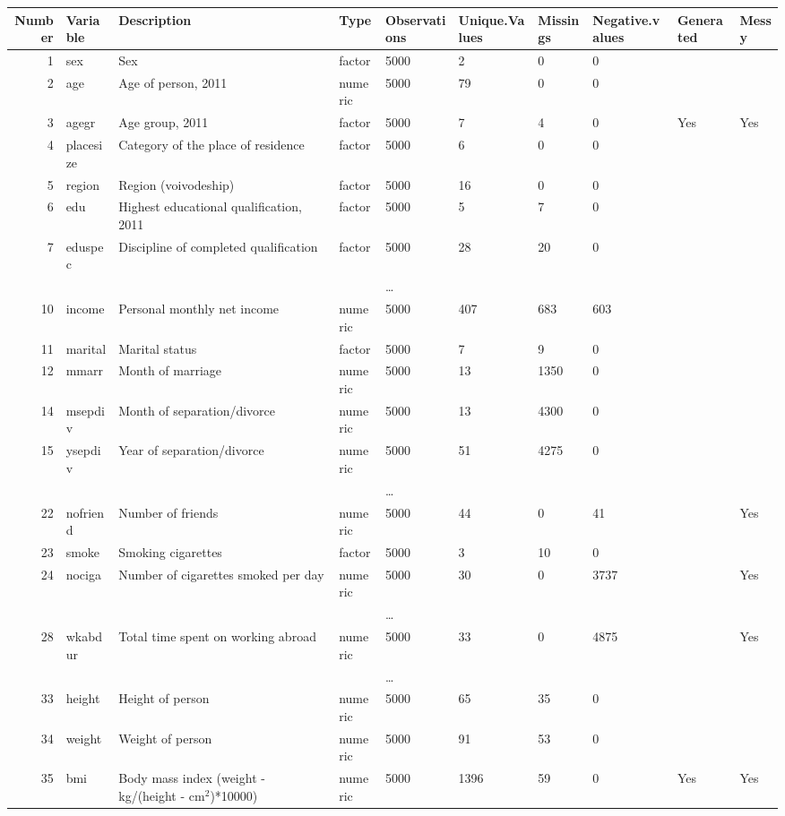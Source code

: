 \begin{tabular}{rlllllllll}
  \toprule
Number & Variable & Description & Type & Observations & Unique.Values & Missings & Negative.values & Generated & Messy \\ 
  \midrule
  1 & sex & Sex & factor & 5000 & 2 & 0 & 0 &  &  \\ 
    2 & age & Age of person, 2011 & numeric & 5000 & 79 & 0 & 0 &  &  \\ 
    3 & agegr & Age group, 2011 & factor & 5000 & 7 & 4 & 0 & Yes & Yes \\ 
    4 & placesize & Category of the place of residence & factor & 5000 & 6 & 0 & 0 &  &  \\ 
    5 & region & Region (voivodeship) & factor & 5000 & 16 & 0 & 0 &  &  \\ 
    6 & edu & Highest educational qualification, 2011 & factor & 5000 & 5 & 7 & 0 &  &  \\ 
    7 & eduspec & Discipline of completed qualification & factor & 5000 & 28 & 20 & 0 &  &  \\ 
   &  &  &  & \dots &  &  &  &  &  \\ 
   10 & income & Personal monthly net income & numeric & 5000 & 407 & 683 & 603 &  &  \\ 
   11 & marital & Marital status & factor & 5000 & 7 & 9 & 0 &  &  \\ 
   12 & mmarr & Month of marriage & numeric & 5000 & 13 & 1350 & 0 &  &  \\ 
   14 & msepdiv & Month of separation/divorce & numeric & 5000 & 13 & 4300 & 0 &  &  \\ 
   15 & ysepdiv & Year of separation/divorce & numeric & 5000 & 51 & 4275 & 0 &  &  \\ 
   &  &  &  & \dots &  &  &  &  &  \\ 
   22 & nofriend & Number of friends & numeric & 5000 & 44 & 0 & 41 &  & Yes \\ 
   23 & smoke & Smoking cigarettes & factor & 5000 & 3 & 10 & 0 &  &  \\ 
   24 & nociga & Number of cigarettes smoked per day & numeric & 5000 & 30 & 0 & 3737 &  & Yes \\ 
   &  &  &  & \dots &  &  &  &  &  \\ 
   28 & wkabdur & Total time spent on working abroad & numeric & 5000 & 33 & 0 & 4875 &  & Yes \\ 
   &  &  &  & \dots &  &  &  &  &  \\ 
   33 & height & Height of person & numeric & 5000 & 65 & 35 & 0 &  &  \\ 
   34 & weight & Weight of person & numeric & 5000 & 91 & 53 & 0 &  &  \\ 
   35 & bmi & Body mass index (weight - kg/(height - cm$^2$)*10000) & numeric & 5000 & 1396 & 59 & 0 & Yes & Yes \\ 
   \bottomrule
\end{tabular}
